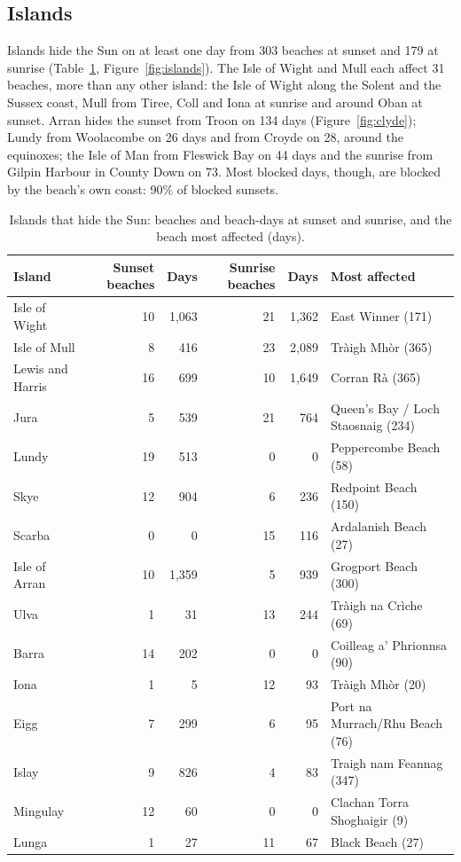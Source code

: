 \documentclass[11pt,a4paper]{article}
\begin{document}
\subsection{Islands}
Islands hide the Sun on at least one day from 303 beaches at sunset and 179 at sunrise (Table~\ref{tab:islands}, Figure~\ref{fig:islands}). The Isle of Wight and Mull each affect 31 beaches, more than any other island: the Isle of Wight along the Solent and the Sussex coast, Mull from Tiree, Coll and Iona at sunrise and around Oban at sunset. Arran hides the sunset from Troon on 134 days (Figure~\ref{fig:clyde}); Lundy from Woolacombe on 26 days and from Croyde on 28, around the equinoxes; the Isle of Man from Fleswick Bay on 44 days and the sunrise from Gilpin Harbour in County Down on 73. Most blocked days, though, are blocked by the beach's own coast: 90\% of blocked sunsets.

\begin{table}[tbp]\centering\footnotesize\caption{Islands that hide the Sun: beaches and beach-days at sunset and sunrise, and the beach most affected (days).}\label{tab:islands}\begin{tabular}{lrrrrl}\toprule Island & Sunset beaches & Days & Sunrise beaches & Days & Most affected\\\midrule
Isle of Wight & 10 & 1,063 & 21 & 1,362 & East Winner (171)\\
Isle of Mull & 8 & 416 & 23 & 2,089 & Tràigh Mhòr (365)\\
Lewis and Harris & 16 & 699 & 10 & 1,649 & Corran Rà (365)\\
Jura & 5 & 539 & 21 & 764 & Queen's Bay / Loch Staosnaig (234)\\
Lundy & 19 & 513 & 0 & 0 & Peppercombe Beach (58)\\
Skye & 12 & 904 & 6 & 236 & Redpoint Beach (150)\\
Scarba & 0 & 0 & 15 & 116 & Ardalanish Beach (27)\\
Isle of Arran & 10 & 1,359 & 5 & 939 & Grogport Beach (300)\\
Ulva & 1 & 31 & 13 & 244 & Tràigh na Crìche (69)\\
Barra & 14 & 202 & 0 & 0 & Coilleag a' Phrionnsa (90)\\
Iona & 1 & 5 & 12 & 93 & Tràigh Mhòr (20)\\
Eigg & 7 & 299 & 6 & 95 & Port na Murrach/Rhu Beach (76)\\
Islay & 9 & 826 & 4 & 83 & Traigh nam Feannag (347)\\
Mingulay & 12 & 60 & 0 & 0 & Clachan Torra Shoghaigir (9)\\
Lunga & 1 & 27 & 11 & 67 & Black Beach (27)\\
\bottomrule\end{tabular}\end{table}
\end{document}
